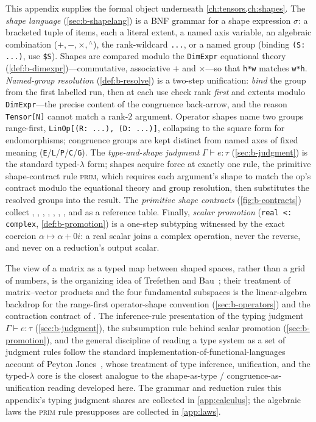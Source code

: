 \summarysection
This appendix supplies the formal object underneath \cref{ch:tensors,ch:shapes}. The
\emph{shape language} (\cref{sec:b-shapelang}) is a BNF grammar for a shape
expression $\sigma$: a bracketed tuple of items, each a literal extent, a named axis
variable, an algebraic combination ($+,-,\times,{}^\wedge$), the rank-wildcard
\lstinline[style=l4style]|...|, or a named group (binding
\lstinline[style=l4style]|(S: ...)|, use \lstinline[style=l4style]|$S|). Shapes are
compared modulo the \lstinline[style=l4style]|DimExpr| equational theory
(\cref{def:b-dimexpr})---commutative, associative $+$ and $\times$---so that
\lstinline[style=l4style]|h*w| matches \lstinline[style=l4style]|w*h|.
\emph{Named-group resolution} (\cref{def:b-resolve}) is a two-step unification:
\emph{bind} the group from the first labelled run, then at each use check rank
\emph{first} and extents modulo \lstinline[style=l4style]|DimExpr|---the precise
content of the congruence back-arrow, and the reason \lstinline[style=l4style]|Tensor[N]|
cannot match a rank-$2$ argument. Operator shapes name two groups range-first,
\lstinline[style=l4style]|LinOp[(R: ...), (D: ...)]|, collapsing to the square form
for endomorphisms; congruence groups are kept distinct from named axes of fixed
meaning (\texttt{E}/\texttt{L}/\texttt{P}/\texttt{C}/\texttt{G}). The
\emph{type-and-shape judgment} $\Gamma \vdash e : \tau$ (\cref{sec:b-judgment}) is
the standard typed-$\lambda$ form; shapes acquire force at exactly one rule, the
primitive shape-contract rule \textsc{prim}, which requires each argument's shape to
match the op's contract modulo the equational theory and group resolution, then
substitutes the resolved groups into the result. The \emph{primitive shape
contracts} (\cref{fig:b-contracts}) collect , , ,
, , , , and  as a
reference table. Finally, \emph{scalar promotion}
(\lstinline[style=l4style]!real <: complex!, \cref{def:b-promotion}) is a one-step
subtyping witnessed by the exact coercion $\alpha\mapsto\alpha+0i$: a real scalar
joins a complex operation, never the reverse, and never on a reduction's output
scalar.

\furtherreading
The view of a matrix as a typed map between shaped spaces, rather than a grid of
numbers, is the organizing idea of Trefethen and Bau~\citep{trefethenbau1997}; their
treatment of matrix--vector products and the four fundamental subspaces is the
linear-algebra backdrop for the range-first operator-shape convention
(\cref{sec:b-operators}) and the contraction contract of . The
inference-rule presentation of the typing judgment $\Gamma\vdash e:\tau$
(\cref{sec:b-judgment}), the subsumption rule behind scalar promotion
(\cref{sec:b-promotion}), and the general discipline of reading a type system as a
set of judgment rules follow the standard implementation-of-functional-languages
account of Peyton Jones~\citep{peytonjones2003}, whose treatment of type inference,
unification, and the typed-$\lambda$ core is the closest analogue to the
shape-as-type / congruence-as-unification reading developed here. The grammar and
reduction rules this appendix's typing judgment shares are collected in
\cref{app:calculus}; the algebraic laws the \textsc{prim} rule presupposes are
collected in \cref{app:laws}.
